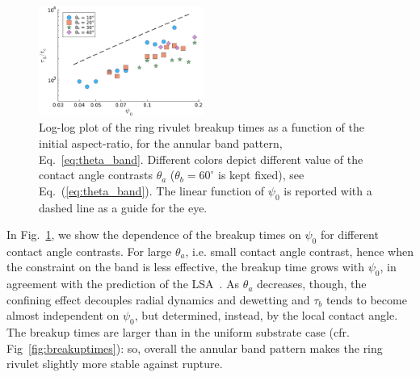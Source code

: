 \documentclass[twoside,twocolumn,9pt]{article}
\begin{document}
\begin{figure}
    \centering
    \includegraphics[width=0.48\textwidth]{Figure_6.pdf}
    \caption{Log-log plot of the ring rivulet breakup times as a function of the initial aspect-ratio, for the annular band pattern, Eq.~\ref{eq:theta_band}.
    Different colors depict different value of the contact angle contrasts $\theta_a$ ($\theta_b = 60^{\circ}$ is kept fixed), see Eq.~(\ref{eq:theta_band}).
    The linear function of $\psi_0$ is reported with a dashed line as a guide for the eye.
    }
    \label{fig:bandBreakupT}
\end{figure}
In Fig.~\ref{fig:bandBreakupT}, we show the dependence of the breakup times on $\psi_0$ for different contact angle contrasts. 
For large $\theta_a$, i.e. small contact angle contrast, hence when the constraint on the band is less effective, the breakup time grows with $\psi_0$, in agreement with the prediction of the LSA~\cite{gonzalezStabilityLiquidRing2013}. 
As $\theta_a$ decreases, though, the confining effect decouples radial dynamics and dewetting and $\tau_b$ tends to become almost independent on $\psi_0$, but determined, instead, by the local contact angle. 
The breakup times are larger than in the uniform substrate case (cfr. Fig~\ref{fig:breakuptimes}): so, overall the annular band pattern makes the ring rivulet slightly more stable against rupture.
\end{document}

